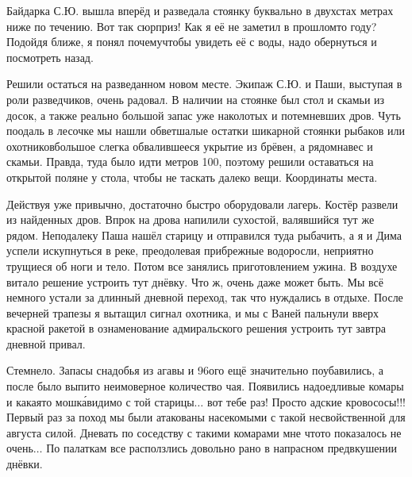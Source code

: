Байдарка С.Ю. вышла вперёд и разведала стоянку буквально в двухстах метрах ниже по течению. Вот так сюрприз! Как я её не заметил в прошлом\sdash то году? Подойдя ближе, я понял почему\mdash чтобы увидеть её с воды, надо обернуться и посмотреть назад. 

Решили остаться на разведанном новом месте. Экипаж С.Ю. и Паши, выступая в роли разведчиков, очень радовал. В наличии на стоянке был стол и скамьи из досок, а также реально большой запас уже наколотых и потемневших дров. Чуть поодаль в лесочке мы нашли обветшалые остатки шикарной стоянки рыбаков или охотников\mdash  большое слегка обвалившееся укрытие из брёвен, а рядом\mdash  навес и скамьи. Правда, туда было идти метров 100, поэтому решили оставаться на открытой поляне у стола, чтобы не таскать далеко вещи. Координаты места\mdash \CoordsChagodoschaSixteenNearKaban. 

Действуя уже привычно, достаточно быстро оборудовали лагерь. Костёр развели из найденных дров. Впрок на дрова напилили сухостой, валявшийся тут же рядом. Неподалеку Паша нашёл старицу и отправился туда рыбачить, а я и Дима успели искупнуться в реке, преодолевая прибрежные водоросли, неприятно трущиеся об ноги и тело. Потом все занялись приготовлением ужина. В воздухе витало решение устроить тут днёвку. Что ж, очень даже может быть. Мы всё немного устали за длинный дневной переход, так что нуждались в отдыхе. После вечерней трапезы я вытащил сигнал охотника, и мы с Ваней пальнули вверх красной ракетой в ознаменование адмиральского решения устроить тут завтра дневной привал.

Стемнело. Запасы снадобья из агавы и 96\sdash ого ещё значительно поубавились, а после было выпито неимоверное количество чая. Появились надоедливые комары и какая\sdash то мошк\'{а}\mdash  видимо с той старицы$\ldots$ вот тебе раз! Просто адские кровососы!!! Первый раз за поход мы были атакованы насекомыми с такой несвойственной для августа силой. Дневать по соседству с такими комарами мне что\sdash то показалось не очень$\ldots$ По палаткам все расползлись довольно рано в напрасном предвкушении днёвки. 

\begin{center}
\end{center}
